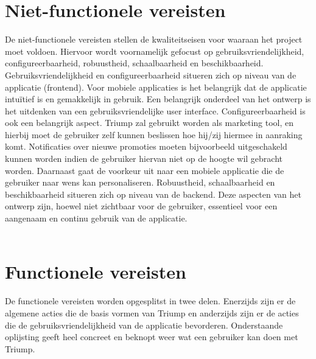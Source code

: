 \section{Niet-functionele vereisten}
De niet-functionele vereisten stellen de kwaliteitseisen voor waaraan het project moet voldoen. Hiervoor wordt voornamelijk gefocust op gebruiksvriendelijkheid, configureerbaarheid, robuustheid, schaalbaarheid en beschikbaarheid.
Gebruiksvriendelijkheid en configureerbaarheid situeren zich op niveau van de applicatie (frontend). Voor mobiele applicaties is het belangrijk dat de applicatie intuïtief is en gemakkelijk in gebruik. Een belangrijk onderdeel van het ontwerp is het uitdenken van een gebruiksvriendelijke user interface. Configureerbaarheid is ook een belangrijk aspect. Triump zal gebruikt worden als marketing tool, en hierbij moet de gebruiker zelf kunnen beslissen hoe hij/zij hiermee in aanraking komt. Notificaties over nieuwe promoties moeten bijvoorbeeld uitgeschakeld kunnen worden indien de gebruiker hiervan niet op de hoogte wil gebracht worden. Daarnaast gaat de voorkeur uit naar een mobiele applicatie die de gebruiker naar wens kan personaliseren.
Robuustheid, schaalbaarheid en beschikbaarheid situeren zich op niveau van de backend. Deze aspecten van het ontwerp zijn, hoewel niet zichtbaar voor de gebruiker, essentieel voor een aangenaam en continu gebruik van de applicatie.
\\\\
\section{Functionele vereisten}
De functionele vereisten worden opgesplitst in twee delen. Enerzijds zijn er de algemene acties die de basis vormen van Triump en anderzijds zijn er de acties die de gebruiksvriendelijkheid van de applicatie bevorderen. Onderstaande oplijsting geeft heel concreet en beknopt weer wat een gebruiker kan doen met Triump.

